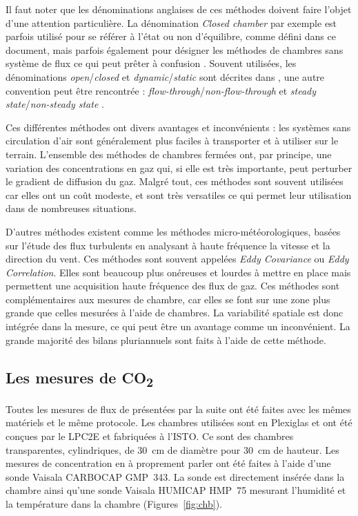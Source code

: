 Il faut noter que les dénominations anglaises de ces méthodes doivent faire l'objet d'une attention particulière.
La dénomination \textit{Closed chamber} par exemple est parfois utilisé pour se référer à l'état ou non d'équilibre, comme défini dans ce document, mais parfois également pour désigner les méthodes de chambres sans système de flux ce qui peut prêter à confusion \citep{pumpanen2004}.
Souvent utilisées, les dénominations \textit{open}/\textit{closed} et \textit{dynamic}/\textit{static} sont décrites dans \citet{luo2006161}, une autre convention peut être rencontrée : \textit{flow-through}/\textit{non-flow-through} et \textit{steady state}/\textit{non-steady state} \citep{livingston1995}.

Ces différentes méthodes ont divers avantages et inconvénients : les systèmes sans circulation d'air sont généralement plus faciles à transporter et à utiliser sur le terrain.
L'ensemble des méthodes de chambres fermées ont, par principe, une variation des concentrations en gaz qui, si elle est très importante, peut perturber le gradient de diffusion du gaz.
Malgré tout, ces méthodes sont souvent utilisées car elles ont un coût modeste, et sont très versatiles ce qui permet leur utilisation dans de nombreuses situations.

D'autres méthodes existent comme les méthodes micro-météorologiques, basées sur l'étude des flux turbulents en analysant à haute fréquence la vitesse et la direction du vent.
Ces méthodes sont souvent appelées \textit{Eddy Covariance} ou \textit{Eddy Correlation}.
Elles sont beaucoup plus onéreuses et lourdes à mettre en place mais permettent une acquisition haute fréquence des flux de gaz.
Ces méthodes sont complémentaires aux mesures de chambre, car elles se font sur une zone plus grande que celles mesurées à l'aide de chambres.
La variabilité spatiale est donc intégrée dans la mesure, ce qui peut être un avantage comme un inconvénient.
La grande majorité des bilans pluriannuels sont faits à l'aide de cette méthode.


\subsection{Les mesures de \texorpdfstring{CO\textsubscript{2}}{CO2}}
\label{subsec:ss_mes_co2}

Toutes les mesures de flux de \coo présentées par la suite ont été faites avec les mêmes matériels et le même protocole.
Les chambres utilisées sont en Plexiglas\textsuperscript{\textregistered} et ont été conçues par le LPC2E et fabriquées à l'ISTO.
Ce sont des chambres transparentes, cylindriques, de \SI{30}{\centi\metre} de diamètre pour \SI{30}{\centi\metre} de hauteur.
Les mesures de concentration en \coo à proprement parler ont été faites à l'aide d'une sonde Vaisala CARBOCAP\textsuperscript{\textregistered} GMP~343.
La sonde est directement insérée dans la chambre ainsi qu'une sonde Vaisala HUMICAP\textsuperscript{\textregistered} HMP~75 mesurant l'humidité et la température dans la chambre (Figures~\ref{fig:chb}).

